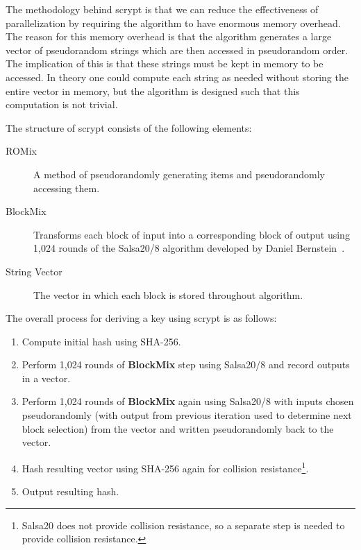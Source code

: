 \documentclass[11pt]{article}
\begin{document}
The methodology behind scrypt is that we can reduce the effectiveness of parallelization by requiring the algorithm to
have enormous memory overhead. The reason for this memory overhead is that the algorithm generates a large vector of
pseudorandom strings which are then accessed in pseudorandom order. The implication of this is that these strings must
be kept in memory to be accessed. In theory one could compute each string as needed without storing the entire vector in
memory, but the algorithm is designed such that this computation is not trivial.

The structure of scrypt consists of the following elements:
\begin{description}
    \item[ROMix] A method of pseudorandomly generating items and pseudorandomly accessing them. 
    \item[BlockMix] Transforms each block of input into a corresponding block of output using 1,024 rounds of the
        {\sc Salsa20/8} algorithm developed by Daniel Bernstein~\cite{bernstein08}.
    \item[String Vector] The vector in which each block is stored throughout algorithm.
\end{description}

The overall process for deriving a key using scrypt is as follows:
\begin{enumerate}
    \item Compute initial hash using {\sc SHA-256}.
    \item Perform 1,024 rounds of \textbf{BlockMix} step using {\sc Salsa20/8} and record outputs in a vector.
    \item Perform 1,024 rounds of \textbf{BlockMix} again using {\sc Salsa20/8} with inputs chosen pseudorandomly (with
        output from previous iteration used to determine next block selection) from the vector and written
        pseudorandomly back to the vector.
    \item Hash resulting vector using {\sc SHA-256} again for collision resistance\footnote{{\sc Salsa20} does not
            provide collision resistance, so a separate step is needed to provide collision resistance.}.
    \item Output resulting hash.
\end{enumerate}
\end{document}

